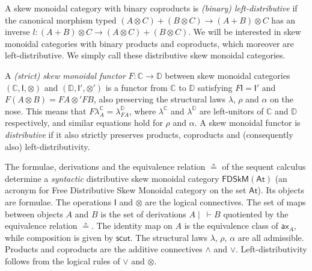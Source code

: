 \documentclass[submission,copyright,creativecommons]{eptcs}
\theoremstyle{definition}
\newcommand{\ax}{\mathsf{ax}}
\newcommand{\ot}{\otimes}
\newcommand{\I}{\mathsf{I}}
\newcommand{\FSkMCC}{\mathsf{FDSkM}}
\begin{document}
\begin{center}
\end{center}
A skew monoidal category with binary coproducts is \emph{(binary) left-distributive} if the canonical morphism typed $(A \ot C) + (B \ot C) \to (A + B) \ot C$ has an inverse $l : (A + B) \ot C \to (A \ot C) + (B \ot C)$. We will be interested in skew monoidal categories with binary products and coproducts, which moreover are left-distributive. We simply call these distributive skew monoidal categories.

A \emph{(strict) skew monoidal functor} $F : \mathbb{C} \rightarrow \mathbb{D}$ between skew monoidal categories $(\mathbb{C} , \I , \ot)$ and $(\mathbb{D} , \I' , \ot')$ is a functor from $\mathbb{C}$ to $\mathbb{D}$ satisfying
    $F \I = \I'$ and $F (A \ot B) = F A \ot' F B$, also preserving the structural laws $\lambda$, $\rho$ and $\alpha$ on the nose. This means that $F \lambda_A^\mathbb{C} = \lambda_{FA}^\mathbb{D}$, where $\lambda^\mathbb{C}$ and $\lambda^\mathbb{D}$ are left-unitors of $\mathbb{C}$ and $\mathbb{D}$ respectively, and similar equations hold for $\rho$ and $\alpha$. A skew monoidal functor is \emph{distributive} if it also strictly preserves products, coproducts and (consequently also) left-distributivity.

The formulae, derivations and the equivalence relation $\circeq$ of the sequent calculus determine a \emph{syntactic} distributive skew monoidal category $\FSkMCC(\mathsf{At})$ (an acronym for \textsf{F}ree \textsf{D}istributive \textsf{Sk}ew \textsf{M}onoidal category on the set $\mathsf{At}$). Its objects are formulae. The operations $\I$ and $\ot$ are the logical connectives. The set of maps between objects $A$ and $B$ is the set of derivations $A \mid ~ \vdash B$ quotiented by the equivalence relation $\circeq$. The identity map on $A$ is the equivalence class of $\ax_A$, while composition is given by $\mathsf{scut}$. The structural laws $\lambda$, $\rho$, $\alpha$ are all admissible. Products and coproducts are the additive connectives $\land$ and $\lor$. Left-distributivity follows from the logical rules of $\lor$ and $\ot$.
\end{document}
